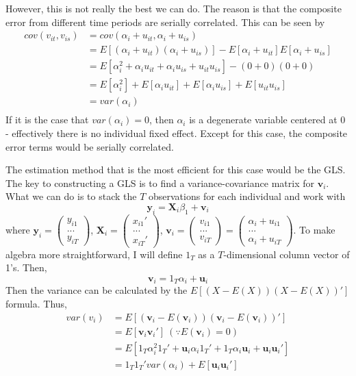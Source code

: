 \documentclass[12pt]{article}
\theoremstyle{definition}
\theoremstyle{property}
\theoremstyle{assumption}
\theoremstyle{example}
\theoremstyle{comment}
\begin{document}
However, this is not really the best we can do. The reason is that the composite error from different time periods are serially correlated. This can be seen by
\[
\begin{aligned}
cov(v_{it},v_{is})&=cov(\alpha_i + u_{it},\alpha_i + u_{is})\\
&=E[(\alpha_i + u_{it})(\alpha_i + u_{is})]-E[\alpha_i + u_{it}]E[\alpha_i + u_{is}]\\
&=E[\alpha_i^2 + \alpha_iu_{it}+\alpha_iu_{is}+u_{it}u_{is}]-(0+0)(0+0)\\
&=E[\alpha_i^2] + E[\alpha_iu_{it}]+E[\alpha_iu_{is}]+E[u_{it}u_{is}]\\
&=var(\alpha_i)\\
\end{aligned}
\]
If it is the case that $var(\alpha_i)=0$, then $\alpha_i$ is a degenerate variable centered at 0 - effectively there is no individual fixed effect. Except for this case, the composite error terms would be serially correlated. \par
The estimation method that is the most efficient for this case would be the GLS. The key to constructing a GLS is to find a variance-covariance matrix for $\mathbf{v}_i$. What we can do is to stack the $T$ observations for each individual and work with
\[
\mathbf{y}_ i = \mathbf{X}_i\beta_1 + \mathbf{v}_i
\]
where $\mathbf{y}_i = \begin{pmatrix}y_{i1} \\ ... \\ y_{iT} \end{pmatrix}$, $\mathbf{X}_i=\begin{pmatrix}x_{i1}' \\ ... \\ x_{iT}' \end{pmatrix}$,  $\mathbf{v}_i = \begin{pmatrix}v_{i1} \\ ... \\ v_{iT} \end{pmatrix}=\begin{pmatrix}\alpha_i+u_{i1} \\ ... \\ \alpha_i+u_{iT} \end{pmatrix}$. To make algebra more straightforward, I will define $1_T$ as a $T$-dimensional column vector of 1's.  Then,
\[
\mathbf{v}_i = 1_T\alpha_i + \mathbf{u}_i
\]
Then the variance can be calculated by the $E[(X-E(X))(X-E(X))']$ formula. Thus,
\begin{align*}
var(v_i)&=E[(\mathbf{v}_i-E(\mathbf{v}_i))(\mathbf{v}_i-E(\mathbf{v}_i))']\\
&=E[\mathbf{v}_i\mathbf{v}_i'] \ (\because E(\mathbf{v}_i)=0)\\
&=E\left[1_T\alpha_i^2 1_T' + \mathbf{u}_i\alpha_i 1_T'+1_T\alpha_i \mathbf{u}_i + \mathbf{u}_i\mathbf{u}_i' \right]\\
&=1_T1_T'var(\alpha_i)+E[ \mathbf{u}_i\mathbf{u}_i' ]
\end{align*} 
\end{document}
